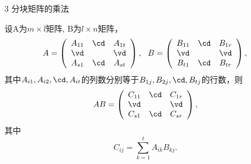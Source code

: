 \begin{frame}
\begin{overprint}
    \begin{itemize}
    \item[3] 
      分块矩阵的乘法
    \item[]
      设A为$m\times l$矩阵, B为$l \times n$矩阵，
      $$
      A = \left(
      \begin{array}{ccc}
        A_{11} & \cd & A_{1t} \\
        \vd   &     & \vd   \\
        A_{s1} & \cd & A_{st}
      \end{array}
      \right), \ \ 
      B = \left(
      \begin{array}{ccc}
        B_{11} & \cd & B_{1r} \\
        \vd   &     & \vd   \\
        B_{t1} & \cd & B_{tr}
      \end{array}
      \right),
      $$
      其中$A_{i1}, A_{i2}, \cd, A_{it}$的列数分别等于$B_{1j}, B_{2j}, \cd, B_{tj}$的行数，则
      $$
      A B = \left(
      \begin{array}{ccc}
        C_{11}   & \cd & C_{1r}  \\
        \vd   &     & \vd   \\
        C_{s1}   & \cd & C_{sr}
      \end{array}
      \right),
      $$
      其中
      $$
      C_{ij} = \sum_{k=1}^t A_{ik} B_{kj}.
      $$
    \end{itemize}


  \end{overprint}

\end{frame}
